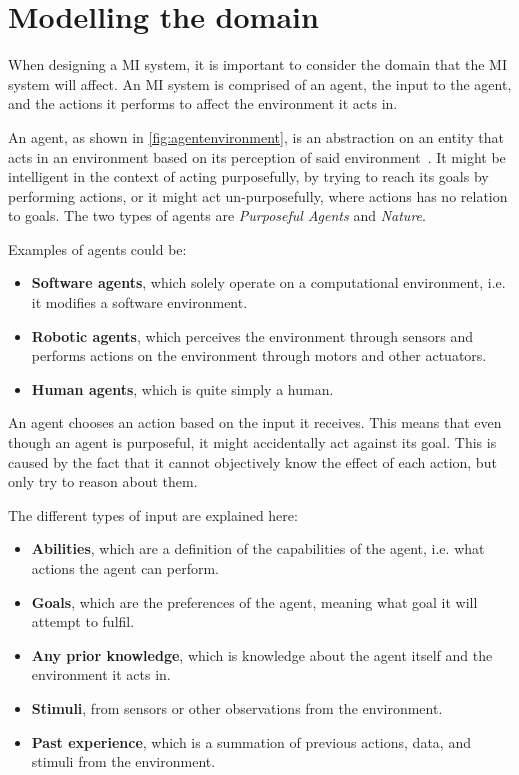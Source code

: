 \section{Modelling the domain}\label{Theory:MIModelling}
When designing a MI system, it is important to consider the domain that the MI system will affect.
An MI system is comprised of an agent, the input to the agent, and the actions it performs to affect the environment it acts in.



An agent, as shown in \autoref{fig:agentenvironment}, is an abstraction on an entity that acts in an environment based on its perception of said environment~\cite{ArtificialIntelligencealanpoole}.
It might be intelligent in the context of acting purposefully, by trying to reach its goals by performing actions, or it might act un-purposefully, where actions has no relation to goals.
The two types of agents are \textit{Purposeful Agents} and \textit{Nature}.

Examples of agents could be:
\begin{itemize}
	\item \textbf{Software agents}, which solely operate on a computational environment, i{.}e{.} it modifies a software environment.
	\item \textbf{Robotic agents}, which perceives the environment through sensors and performs actions on the environment through motors and other actuators.
	\item \textbf{Human agents}, which is quite simply a human. 
\end{itemize}

An agent chooses an action based on the input it receives.
This means that even though an agent is purposeful, it might accidentally act against its goal.
This is caused by the fact that it cannot objectively know the effect of each action, but only try to reason about them.

The different types of input are explained here:
\begin{itemize}
    \item \textbf{Abilities}, which are a definition of the capabilities of the agent, i{.}e{.} what actions the agent can perform.
    \item \textbf{Goals}, which are the preferences of the agent, meaning what goal it will attempt to fulfil.
    \item \textbf{Any prior knowledge}, which is knowledge about the agent itself and the environment it acts in.
    \item \textbf{Stimuli}, from sensors or other observations from the environment.
    \item \textbf{Past experience}, which is a summation of previous actions, data, and stimuli from the environment.
\end{itemize}


